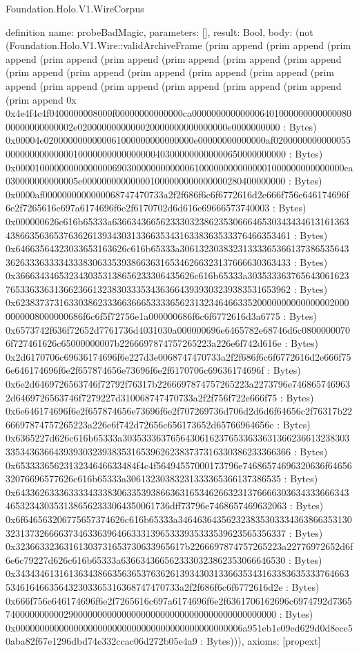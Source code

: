 \begin{lexlean}{Foundation.Holo.V1.WireCorpus}
\begin{semanticmodule}
definition{
  name: probeBadMagic,
  parameters: [],
  result: Bool,
  body: (not (Foundation.Holo.V1.Wire::validArchiveFrame (prim append (prim append (prim append (prim append (prim append (prim append (prim append (prim append (prim append (prim append (prim append (prim append (prim append (prim append (prim append (prim append (prim append (prim append (prim append (prim append 0x 0x4e4f4c4f0400000008000f00000000000000ca00000000000000640100000000000008000000000000002e0200000000000020000000000000000e0000000000 : Bytes) 0x00004e0200000000000061000000000000000e00000000000000af02000000000000550000000000000010000000000000000403000000000000650000000000 : Bytes) 0x00001000000000000000690300000000000061000000000000001000000000000000ca030000000000005e000000000000001000000000000000280400000000 : Bytes) 0x0000af0000000000000068747470733a2f2f686f6c6f6772616d2e666f756e646174696f6e2f7265616c697a6174696f6e2f6170702d6d616e69666573740003 : Bytes) 0x000000626c616b65333a636634366562333032386235306664653034343461316136343866356365376362613934303133663534316338363533376466353461 : Bytes) 0x64663564323033653163626c616b65333a3061323038323133336536613738653564336263336333343338306335393866363165346266323137666630363433 : Bytes) 0x3666343465323430353138656233306435626c616b65333a30353336376564306162376533633631366236613238303335343636643939303239383531653962 : Bytes) 0x6238373731633038623336636665333365623132346466335200000000000000020000000008000000686f6c6f5f72756e1a000000686f6c6f6772616d3a6775 : Bytes) 0x6573742f636f72652d7761736d4031030a000000696e6465782e68746d6c08000000706f727461626c65000000007b2266697874757265223a226e6f742d616e : Bytes) 0x2d6170706c69636174696f6e227d3e0068747470733a2f2f686f6c6f6772616d2e666f756e646174696f6e2f657874656e73696f6e2f6170706c69636174696f : Bytes) 0x6e2d6469726563746f72792f76317b2266697874757265223a2273796e7468657469632d6469726563746f7279227d310068747470733a2f2f756f722e666f75 : Bytes) 0x6e646174696f6e2f657874656e73696f6e2f707269736d706d2d6d6f64656c2f76317b2266697874757265223a226e6f742d72656c656173652d65766964656e : Bytes) 0x6365227d626c616b65333a3035333637656430616237653363363136623661323830333534363664393930323938353165396262383737316330386233366366 : Bytes) 0x6533336562313234646633484f4c4f56494557000173796e74686574696320636f6465632076696577626c616b65333a30613230383231333365366137386535 : Bytes) 0x6433626333633334333830633539386636316534626632313766663036343336663434653234303531386562333064350061736dff73796e7468657469632063 : Bytes) 0x6f646563206775657374626c616b65333a3464636435623238353033343638663531303231373266663734633639646633313965333935333539623565356337 : Bytes) 0x32366332363161303731653730633965617b2266697874757265223a22776972652d6f6e6c79227d626c616b65333a6366343665623330323862353066646530 : Bytes) 0x343434613161363438663563653763626139343031336635343163383635333764663534616466356432303365316368747470733a2f2f686f6c6f6772616d2e : Bytes) 0x666f756e646174696f6e2f7265616c697a6174696f6e2f6361706162696c6974792d736574000000000029000000000000000000000000000000000000000000 : Bytes) 0x00000000000000000000000000000000000000000000006a951eb1e09ed629d0d8ece50aba82f67e1296dbd74e332ccac06d272b05e4a9 : Bytes))),
  axioms: [propext]
}


\end{semanticmodule}
\end{lexlean}
